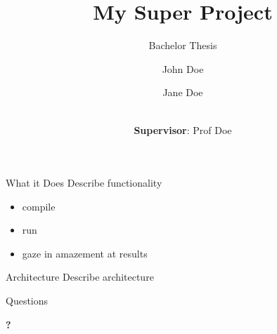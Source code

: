 \documentclass{beamer}
\title{My Super Project}
\subtitle{Bachelor Thesis}
\author{John Doe \and Jane Doe \and \\
  \textbf{Supervisor}: Prof Doe}
\begin{document}
\frame{\titlepage}

\begin{frame}{What it Does}
Describe functionality
\begin{itemize}
  \item compile
  \item run
  \item gaze in amazement at results
\end{itemize}
\end{frame}

\begin{frame}{Architecture}
Describe architecture
\end{frame}

\begin{frame}{Questions}
  \begin{center}
    \bfseries
    \Huge
    ?
  \end{center}
\end{frame}
\end{document}
